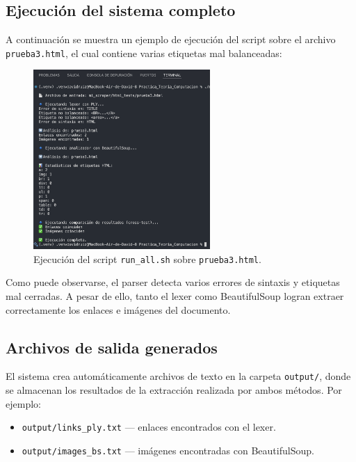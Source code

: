 \documentclass[11pt,a4paper]{article}
\begin{document}
\subsection{Ejecución del sistema completo}

A continuación se muestra un ejemplo de ejecución del script sobre el archivo \texttt{prueba3.html}, el cual contiene varias etiquetas mal balanceadas:

\begin{figure}[H]
    \centering
    \includegraphics[width=0.6\textwidth]{img/ejecucion_prueba3.png}
    \caption*{Ejecución del script \texttt{run\_all.sh} sobre \texttt{prueba3.html}.}
\end{figure}

Como puede observarse, el parser detecta varios errores de sintaxis y etiquetas mal cerradas. A pesar de ello, tanto el lexer como BeautifulSoup logran extraer correctamente los enlaces e imágenes del documento.

\subsection{Archivos de salida generados}

El sistema crea automáticamente archivos de texto en la carpeta \texttt{output/}, donde se almacenan los resultados de la extracción realizada por ambos métodos. Por ejemplo:

\begin{itemize}
    \item \texttt{output/links\_ply.txt} — enlaces encontrados con el lexer.
    \item \texttt{output/images\_bs.txt} — imágenes encontradas con BeautifulSoup.
\end{itemize}
\end{document}
